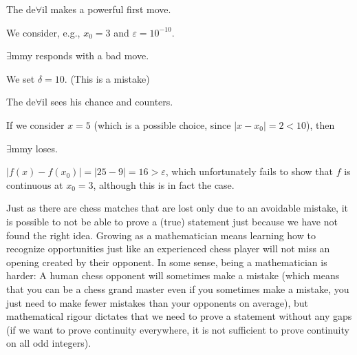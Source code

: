 \documentclass[11pt]{article}
\theoremstyle{plain}
\theoremstyle{definition}
\theoremstyle{remark}
\numberwithin{equation}{section}
\newcommand{\e}{\exists}
\newcommand{\f}{\forall}
\newcommand{\eps}{\varepsilon}
\begin{document}
\begin{paracol}{2}
\begin{nthcolumn*}{0}
The de$\f$il makes a powerful first move.
\end{nthcolumn*}
    \begin{nthcolumn}{1}
    We consider, e.g., $x_0 = 3$ and $\eps = 10^{-10}$. 
    \end{nthcolumn}  
\begin{nthcolumn*}{0}
$\e$mmy responds with a bad move.
\end{nthcolumn*}
    \begin{nthcolumn}{1}
    We set $\delta = 10$. (This is a mistake)
    \end{nthcolumn}  
\begin{nthcolumn*}{0}
The de$\f$il sees his chance and counters.
\end{nthcolumn*}
    \begin{nthcolumn}{1}
    If we consider $x = 5$ (which is a possible choice, since $|x-x_0| = 2 < 10$), then
    \end{nthcolumn}  
\begin{nthcolumn*}{0}
$\e$mmy loses.
\end{nthcolumn*}
    \begin{nthcolumn}{1}
    $|f(x)-f(x_0)| = |25 - 9| = 16 > \eps$, which unfortunately fails to show that $f$ is continuous at $x_0 = 3$, although this is in fact the case.
    \end{nthcolumn}  
\end{paracol}
Just as there are chess matches that are lost only due to an avoidable mistake, it is possible to not be able to prove a (true) statement just because we have not found the right idea. Growing as a mathematician means learning how to recognize opportunities just like an experienced chess player will not miss an opening created by their opponent. In some sense, being a mathematician is harder: A human chess opponent will sometimes make a mistake (which means that you can be a chess grand master even if you sometimes make a mistake, you just need to make fewer mistakes than your opponents on average), but mathematical rigour dictates that we need to prove a statement without any gaps (if we want to prove continuity everywhere, it is not sufficient to prove continuity on all odd integers).
\end{document}
